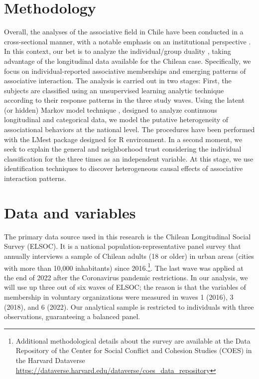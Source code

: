 \section{Methodology}

Overall, the analyses of the associative field in Chile have been conducted in a cross-sectional manner, with a notable emphasis on an institutional perspective \parencite{irarrazaval_chile_2017,irarrazaval_sociedad_2017, programa_de_las_naciones_unidas_para_el_desarrollo_desarrollo_2000}. In this context, our bet is to analyze the individual/group duality \parencite{breiger_duality_1974, mcpherson_hypernetwork_1982}, taking advantage of the longitudinal data available for the Chilean case. Specifically, we focus on individual-reported associative memberships and emerging patterns of associative interaction. The analysis is carried out in two stages: First, the subjects are classified using an unsupervised learning analytic technique \parencite{molina_machine_2019} according to their response patterns in the three study waves. Using the latent (or hidden) Markov model technique \parencite{bartolucci_latent_2015}, designed to analyze continuous longitudinal and categorical data, we model the putative heterogeneity of associational behaviors at the national level. The procedures have been performed with the LMest package \parencite{bartolucci_lmest_2020} designed for R environment. In a second moment, we seek to explain the general and neighborhood trust considering the individual classification for the three times as an independent variable. At this stage, we use identification techniques to discover heterogeneous causal effects of associative interaction patterns.
\bigskip

\section{Data and variables}
The primary data source used in this research is the Chilean Longitudinal Social Survey (ELSOC). It is a national population-representative panel survey that annually interviews a sample of Chilean adults (18 or older) in urban areas (cities with more than 10,000 inhabitants) since 2016.\footnote{Additional methodological details about the survey are available at the Data Repository of the Center for Social Conflict and Cohesion Studies (COES) in the Harvard Dataverse \url{https://dataverse.harvard.edu/dataverse/coes_data_repository}}. The last wave was applied at the end of 2022 after the Coronavirus pandemic restrictions. In our analysis, we will use up three out of six waves of ELSOC; the reason is that the variables of membership in voluntary organizations were measured in waves 1 (2016), 3 (2018), and 6 (2022). Our analytical sample is restricted to individuals with three observations, guaranteeing a balanced panel. 
\bigskip

